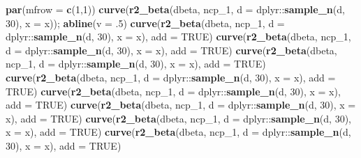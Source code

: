 \documentclass[]{article}
\newenvironment{Shaded}{\begin{snugshade}}{\end{snugshade}}
\newcommand{\KeywordTok}[1]{\textcolor[rgb]{0.13,0.29,0.53}{\textbf{{#1}}}}
\newcommand{\DataTypeTok}[1]{\textcolor[rgb]{0.13,0.29,0.53}{{#1}}}
\newcommand{\DecValTok}[1]{\textcolor[rgb]{0.00,0.00,0.81}{{#1}}}
\newcommand{\OtherTok}[1]{\textcolor[rgb]{0.56,0.35,0.01}{{#1}}}
\newcommand{\NormalTok}[1]{{#1}}
\begin{document}
\begin{Shaded}
\begin{Highlighting}[]
\KeywordTok{par}\NormalTok{(}\DataTypeTok{mfrow =} \KeywordTok{c}\NormalTok{(}\DecValTok{1}\NormalTok{,}\DecValTok{1}\NormalTok{))}
\KeywordTok{curve}\NormalTok{(}\KeywordTok{r2_beta}\NormalTok{(dbeta, ncp_1, }\DataTypeTok{d =} \NormalTok{dplyr::}\KeywordTok{sample_n}\NormalTok{(d, }\DecValTok{30}\NormalTok{), }\DataTypeTok{x =} \NormalTok{x)); }\KeywordTok{abline}\NormalTok{(}\DataTypeTok{v =} \NormalTok{.}\DecValTok{5}\NormalTok{)}
\KeywordTok{curve}\NormalTok{(}\KeywordTok{r2_beta}\NormalTok{(dbeta, ncp_1, }\DataTypeTok{d =} \NormalTok{dplyr::}\KeywordTok{sample_n}\NormalTok{(d, }\DecValTok{30}\NormalTok{), }\DataTypeTok{x =} \NormalTok{x), }\DataTypeTok{add =} \OtherTok{TRUE}\NormalTok{)}
\KeywordTok{curve}\NormalTok{(}\KeywordTok{r2_beta}\NormalTok{(dbeta, ncp_1, }\DataTypeTok{d =} \NormalTok{dplyr::}\KeywordTok{sample_n}\NormalTok{(d, }\DecValTok{30}\NormalTok{), }\DataTypeTok{x =} \NormalTok{x), }\DataTypeTok{add =} \OtherTok{TRUE}\NormalTok{)}
\KeywordTok{curve}\NormalTok{(}\KeywordTok{r2_beta}\NormalTok{(dbeta, ncp_1, }\DataTypeTok{d =} \NormalTok{dplyr::}\KeywordTok{sample_n}\NormalTok{(d, }\DecValTok{30}\NormalTok{), }\DataTypeTok{x =} \NormalTok{x), }\DataTypeTok{add =} \OtherTok{TRUE}\NormalTok{)}
\KeywordTok{curve}\NormalTok{(}\KeywordTok{r2_beta}\NormalTok{(dbeta, ncp_1, }\DataTypeTok{d =} \NormalTok{dplyr::}\KeywordTok{sample_n}\NormalTok{(d, }\DecValTok{30}\NormalTok{), }\DataTypeTok{x =} \NormalTok{x), }\DataTypeTok{add =} \OtherTok{TRUE}\NormalTok{)}
\KeywordTok{curve}\NormalTok{(}\KeywordTok{r2_beta}\NormalTok{(dbeta, ncp_1, }\DataTypeTok{d =} \NormalTok{dplyr::}\KeywordTok{sample_n}\NormalTok{(d, }\DecValTok{30}\NormalTok{), }\DataTypeTok{x =} \NormalTok{x), }\DataTypeTok{add =} \OtherTok{TRUE}\NormalTok{)}
\KeywordTok{curve}\NormalTok{(}\KeywordTok{r2_beta}\NormalTok{(dbeta, ncp_1, }\DataTypeTok{d =} \NormalTok{dplyr::}\KeywordTok{sample_n}\NormalTok{(d, }\DecValTok{30}\NormalTok{), }\DataTypeTok{x =} \NormalTok{x), }\DataTypeTok{add =} \OtherTok{TRUE}\NormalTok{)}
\KeywordTok{curve}\NormalTok{(}\KeywordTok{r2_beta}\NormalTok{(dbeta, ncp_1, }\DataTypeTok{d =} \NormalTok{dplyr::}\KeywordTok{sample_n}\NormalTok{(d, }\DecValTok{30}\NormalTok{), }\DataTypeTok{x =} \NormalTok{x), }\DataTypeTok{add =} \OtherTok{TRUE}\NormalTok{)}
\KeywordTok{curve}\NormalTok{(}\KeywordTok{r2_beta}\NormalTok{(dbeta, ncp_1, }\DataTypeTok{d =} \NormalTok{dplyr::}\KeywordTok{sample_n}\NormalTok{(d, }\DecValTok{30}\NormalTok{), }\DataTypeTok{x =} \NormalTok{x), }\DataTypeTok{add =} \OtherTok{TRUE}\NormalTok{)}

\end{Highlighting}
\end{Shaded}
\end{document}
